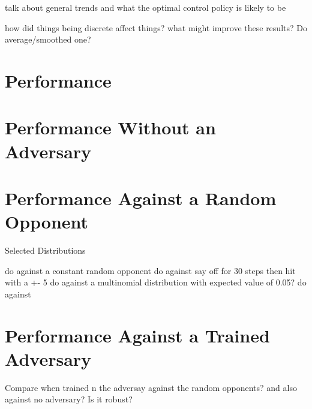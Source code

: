 \documentclass[../main.tex]{subfiles}
\begin{document}
talk about general trends and what the optimal control policy is likely to be

how did things being discrete affect things? what might improve these results? Do average/smoothed one?

\section{Performance}

\section{Performance Without an Adversary}


\section{Performance Against a Random Opponent}
Selected Distributions

do against a constant random opponent
do against say off for 30 steps then hit with a +- 5
do against a multinomial distribution with expected value of 0.05?
do against

\section{Performance Against a Trained Adversary}

Compare when trained n the adversay against the random opponents? and also against no adversary? Is it robust?

\onlyinsubfile{}
\end{document}
